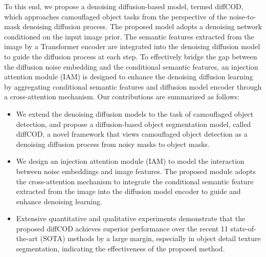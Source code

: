 \documentclass{ecai}
\begin{document}
To this end, we propose a denoising diffusion-based model, termed diffCOD, which approaches camouflaged object tasks from the perspective of the noise-to-mask denoising diffusion process. 
The proposed model adopts a denoising network conditioned on the input image prior. The semantic features extracted from the image by a Transformer encoder are integrated into the denoising diffusion model to guide the diffusion process at each step. 
To effectively bridge the gap between the diffusion noise embedding and the conditional semantic features, an injection attention module (IAM) is designed to enhance the denoising diffusion learning by aggregating conditional semantic features and diffusion model encoder through a cross-attention mechanism. 
Our contributions are summarized as follows: 
\begin{itemize}
    \item We extend the denoising diffusion models to the task of camouflaged object detection, and propose a diffusion-based object segmentation model, called diffCOD, a novel framework that views camouflaged object detection as a denoising diffusion process from noisy masks to object masks. 
  
    
    \item We design an injection attention module (IAM) to model the interaction between noise embeddings and image features. The proposed module adopts the cross-attention mechanism to integrate the conditional semantic feature extracted from the image into the diffusion model encoder to guide and enhance denoising learning. 
    
    
    \item Extensive quantitative and qualitative experiments demonstrate that the proposed diffCOD achieves superior performance over the recent 11 state-of-the-art (SOTA) methods by a large margin, especially in object detail texture segmentation, indicating the effectiveness of the proposed method. 
    
\end{itemize}
\end{document}
